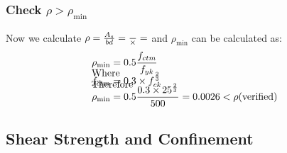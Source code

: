 \subsubsection{Check $\rho > \rho_{\min}$}
Now we calculate $\rho = \frac{A_s}{bd} = \frac{
  \g{As}}{\g{b} \times \g{d}} = \g{rho}$ and $\rho_{\min}$ can
be calculated as:
\begin{align*}
  \rho_{\min} &= 0.5 \frac{f_{ctm}}{f_{yk}} \\
  \\[-1cm]               %
  \intertext{Where}
  \\[-1cm]               %
  f_{ctm} &= 0.3 \times f_{ck}^{\frac{2}{3}} \\
  \\[-1cm]               %
  \intertext{Therefore}
  \\[-1cm]               %
  \rho_{\min} &= 0.5 \frac{0.3 \times 25 ^{\frac{2}{3}}}{500} = 0.0026 < \rho
                \mbox{(verified)}
\end{align*}
\subsection{Shear Strength and Confinement}

